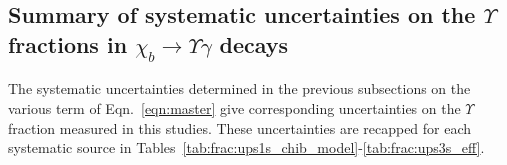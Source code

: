 

\subsection{Summary of systematic uncertainties on the $\Upsilon$ fractions in $\chi_b \to \Upsilon \gamma$ decays}
The systematic uncertainties determined in the previous subsections on the
various term of Eqn.~\ref{eqn:master} give corresponding uncertainties on the
$\Upsilon$ fraction measured in this studies. These uncertainties are recapped
for each systematic source in
Tables~\ref{tab:frac:ups1s_chib_model}-\ref{tab:frac:ups3s_eff}.





